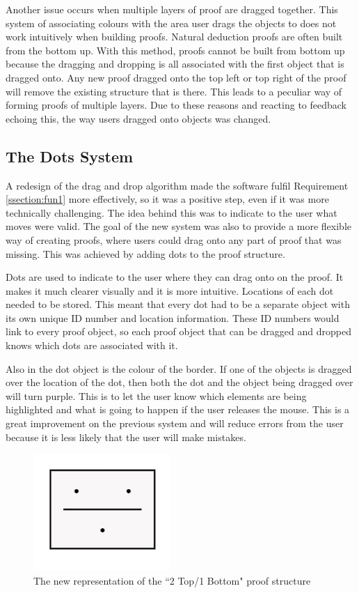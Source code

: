 Another issue occurs when multiple layers of proof are dragged together. This system of associating colours with the area user drags the objects to does not work intuitively when building proofs. Natural deduction proofs are often built from the bottom up. With this method, proofs cannot be built from bottom up because the dragging and dropping is all associated with the first object that is dragged onto. Any new proof dragged onto the top left or top right of the proof will remove the existing structure that is there. This leads to a peculiar way of forming proofs of multiple layers. Due to these reasons and reacting to feedback echoing this, the way users dragged onto objects was changed.  

\subsection{The Dots System} \label{ssec:dots}

A redesign of the drag and drop algorithm made the software fulfil Requirement \ref{ssection:fun1} more effectively, so it was a positive step, even if it was more technically challenging. The idea behind this was to indicate to the user what moves were valid. The goal of the new system was also to provide a more flexible way of creating proofs, where users could drag onto any part of proof that was missing. This was achieved by adding dots to the proof structure.

Dots are used to indicate to the user where they can drag onto on the proof. It makes it much clearer visually and it is more intuitive. Locations of each dot needed to be stored. This meant that every dot had to be a separate object with its own unique ID number and location information. These ID numbers would link to every proof object, so each proof object that can be dragged and dropped knows which dots are associated with it.

Also in the dot object is the colour of the border. If one of the objects is dragged over the location of the dot, then both the dot and the object being dragged over will turn purple. This is to let the user know which elements are being highlighted and what is going to happen if the user releases the mouse. This is a great improvement on the previous system and will reduce errors from the user because it is less likely that the user will make mistakes.  

\begin{figure}[H]
\centering
\centerline{\includegraphics[scale=0.5]{dots}}
\caption{The new representation of the ``2 Top/1 Bottom" proof structure}
 \label{fig:dots}
\end{figure}

